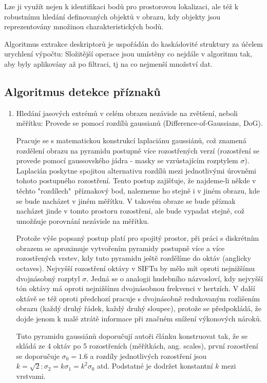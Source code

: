 	Lze ji využít nejen k identifikaci bodů pro prostorovou lokalizaci, ale též k robustnímu hledání definovaných objektů v obrazu, kdy objekty jsou reprezentovány množinou charakteristických bodů.
	
	Algoritmus extrakce deskriptorů je uspořádán do kaskádovité struktury  za účelem urychlení výpočtu: Složitější operace jsou umístěny co  nejdále v algoritmu tak, aby byly aplikovány až po filtraci, tj na co nejmenší množství dat.
	
	\subsection{Algoritmus detekce příznaků}
	
	\begin{enumerate}
		\item Hledání jasových extrémů v celém obrazu nezávisle na zvětšení, neboli měřítku: Provede se pomocí rozdílů gaussianů (Difference-of-Gaussians, DoG).
			
			Pracuje se s matematickou konstrukcí laplaciánu gaussiánů, což znamená rozdělení obrazu na pyramidu postupně více rozostřených verzí (rozostření se provede pomocí gaussovského jádra - masky se vzrůstajícím rozptylem $\sigma{}$). Laplacián poskytne spojitou alternativu rozdílů mezi jednotlivými úrovněmi tohoto postupného rozostření. Tento postup zajišťuje, že najdeme-li někde v těchto "rozdílech"\ příznakový bod, nalezneme ho stejně i v jiném obrazu, kde se bude nacházet v jiném měřítku. V takovém obraze se bude příznak nacházet jinde v tomto prostoru rozostření, ale bude vypadat stejně, což umožňuje porovnání nezávisle na měřítku.
			
			Protože výše popsaný postup platí pro spojitý prostor, při práci s diskrétním obrazem se aproximuje vytvořením pyramidy postupně více a více rozostřených vrstev, kdy tuto pyramidu ještě rozdělíme do oktáv (anglicky octaves). Nejvyšší rozostření oktávy v SIFTu by mělo mít oproti nejnižšímu dvojnásobný rozptyl $\sigma$. Jedná se o analogii hudebního názvosloví, kdy nejvyšší tón oktávy má oproti nejnižšímu dvojnásobnou frekvenci v hertzích. V další oktávě se též oproti předchozí pracuje s dvojnásobně redukovaným rozlišením obrazu (každý druhý řádek, každý druhý sloupec), protože se předpokládá, že dojde jenom k malé ztrátě informace při značném snížení výkonových nároků.
			
			Tuto pyramidu gaussiánů doporučují autoři článku \cite{lowe2004distinctive} konstruovat tak, že se skládá ze 4 oktáv po 5 rozostřeních (měřítkách, ang. scales), první rozostření se doporučuje $\sigma_0 = 1.6$ a rozdíly jednotlivých rozostření jsou $k=\sqrt{2}: \sigma_2 = k \sigma_1 = k^2 \sigma_0$ atd. Podstatné je dodržet konstantní $k$ mezi vrstvami.
			

\end{enumerate}
